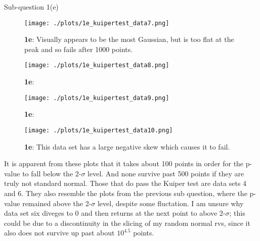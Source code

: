 \begin{subsection}{Sub-question 1(e)}
\begin{figure}[h!]
  \centering
  \texttt{[image: ./plots/1e\_kuipertest\_data7.png]}
  \caption{\textbf{1e}: Visually appears to be the most Gaussian, but is too flat at the peak and so fails after 1000 points.}
\end{figure}

\begin{figure}[h!]
  \centering
  \texttt{[image: ./plots/1e\_kuipertest\_data8.png]}
  \caption{\textbf{1e}: }
\end{figure}

\begin{figure}[h!]
  \centering
  \texttt{[image: ./plots/1e\_kuipertest\_data9.png]}
  \caption{\textbf{1e}: }
\end{figure}

\begin{figure}[h!]
  \centering
  \texttt{[image: ./plots/1e\_kuipertest\_data10.png]}
  \caption{\textbf{1e}: This data set has a large negative skew which causes it to fail.}
\end{figure}

It is apparent from these plots that it takes about 100 points in order for the p-value to fall below the 2-$\sigma$ level. And none survive past 500 points if they are truly not standard normal. Those that do pass the Kuiper test are data sets 4 and 6. They also resemble the plots from the previous sub question, where the p-value remained above the 2-$\sigma$ level, despite some fluctation. I am unsure why data set six diveges to 0 and then returns at the next point to above 2-$\sigma$; this could be due to a discontinuity in the slicing of my random normal rvs, since it also does not survive up past about $10^{4.5}$ points.

\end{subsection}

